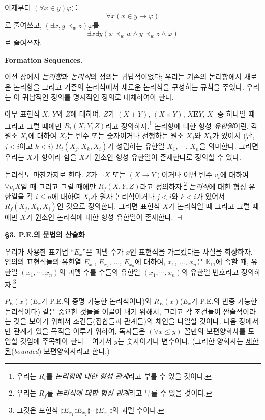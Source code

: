 \documentclass[12pt]{paper}
\newenvironment{context}[1][]
{ \noindent \textbf{{#1}.}
}
{ \hfill $ \dashv $
}
\begin{document}
이제부터 $ \left( \forall x \in y \right) \varphi $를 $$ \forall x \left( x \in y \rightarrow \varphi \right) $$로 줄여쓰고,
$ \left( \exists x , y \prec_{w} z \right) \varphi$를 $$ \exists x \exists y \left( x \prec_{w} w \land y \prec_{w} z \land \varphi \right) $$로 줄여쓰자.

\begin{context}[Formation Sequences]
이전 장에서 \textit{논리항}과 \textit{논리식}의 정의는 귀납적이었다;
우리는 기존의 논리항에서 새로운 논리항을 그리고 기존의 논리식에서 새로운 논리식을 구성하는 규칙을 주었다.
우리는 이 귀납적인 정의를 명시적인 정의로 대체하여야 한다.

아무 표현식 $X$, $Y$와 $Z$에 대하여,
$Z$가 $\left( X + Y \right)$, $\left( X \times Y \right)$, $X \mathbf{E} Y$, $X^{\prime}$ 중 하나일 때 그리고 그럴 때에만
$R_t \left( X , Y , Z \right)$라고 정의하자.\footnote
{
우리는 $R_t$를 \textit{논리항에 대한 형성 관계}라고 부를 수 있을 것이다.
}
논리항에 대한 형성 \textit{유한열}이란, 각 원소 $X_{i}$에 대하여 $X_{i}$는 변수 또는 숫자이거나 선행하는 원소 $X_{j}$와 $X_{k}$가 있어서 (단, $j < i$이고 $k < i$) $R_t \left( X_{j}, X_{k}, X_{i} \right)$가 성립하는 유한열 $X_1$, $\cdots$, $X_n$을 의미한다.
그러면 우리는 $X$가 항이라 함을 $X$가 원소인 형성 유한열이 존재한다로 정의할 수 있다.

논리식도 마찬가지로 한다. $Z$가 $\lnot X$ 또는 $\left( X \to Y \right)$이거나 어떤 변수 $v_{i}$에 대하여 $\forall v_{i} X$일 때 그리고 그럴 때에만
$R_f \left( X , Y , Z \right)$라고 정의하자.\footnote
{
우리는 $R_f$를 \textit{논리식에 대한 형성 관계}라고 부를 수 있을 것이다.
}
\textit{논리식}에 대한 형성 유한열을 각 $i \le n$에 대하여 $X_{i}$가 원자 논리식이거나 $j < i$와 $k < i$가 있어서 $R_f \left( X_{j} , X_{k} , X_{i} \right)$인 것으로 정의한다.
그러면 표현식 $X$가 논리식일 때 그리고 그럴 때에만 $X$가 원소인 논리식에 대한 형성 유한열이 존재한다.
\end{context}

\noindent \textbf{\S3. P.E.의 문법의 산술화}

우리가 사용한 표기법 ``$E_{x}$''은 괴델 수가 $x$인 표현식을 가르켰다는 사실을 회상하자.
임의의 표현식들의 유한열 $E_{x_1}$, $E_{x_2}$, ..., $E_{x_n}$에 대하여, $x_1$, ..., $x_n$은 $\mathbb{K}_{11}$에 속할 때,
유한열 $\left( x_{1}, \cdots, x_{n} \right)$의 괴델 수를 수들의 유한열 $\left( x_{1}, \cdots, x_{n} \right)$의 유한열 번호라고 정의하자.\footnote
{
그것은 표현식 $\sharp E_{x_1} \sharp E_{x_2} \sharp \cdots \sharp E_{x_n} \sharp$의 괴델 수이다.
}

$P_E \left( x \right)$($E_x$가 P.E.의 증명 가능한 논리식이다)와 $R_E \left( x \right)$($E_x$가 P.E.의 반증 가능한 논리식이다) 같은 중요한 것들을 이끌어 내기 위해서,
그리고 각 조건들이 싼술적이라는 것을 보이기 위해서 조건들(집합들과 관계들)의 체인을 나열할 것이다.
다음 장에서만 관계가 있을 목적을 이루기 위하여, 독자들은 $\left( \forall x \le y \right)$ 꼴만의 보편양화사를 도입할 것임에 주목해야 한다 -- 여기서 $y$는 숫자이거나 변수이다. (그러한 양화사는 \underline{제한된}(\textit{bounded}) 보편양화사라고 한다.)
\end{document}
